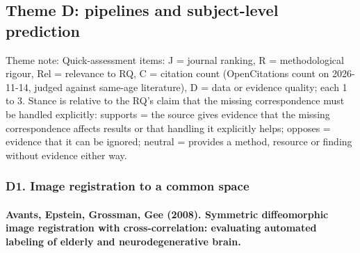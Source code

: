 \documentclass[journal,onecolumn]{IEEEtran}
\begin{document}
\subsection{Theme D: pipelines and subject-level prediction}

Theme note: Quick-assessment items: J = journal ranking, R = methodological rigour, Rel = relevance to RQ, C = citation count (OpenCitations count on 2026-11-14, judged against same-age literature), D = data or evidence quality; each 1 to 3. Stance is relative to the RQ's claim that the missing correspondence must be handled explicitly: supports = the source gives evidence that the missing correspondence affects results or that handling it explicitly helps; opposes = evidence that it can be ignored; neutral = provides a method, resource or finding without evidence either way.

\subsubsection{D1. Image registration to a common space}

\paragraph{Avants, Epstein, Grossman, Gee (2008). Symmetric diffeomorphic image registration with cross-correlation: evaluating automated labeling of elderly and neurodegenerative brain.~\cite{Avants2008Symmetric}}\mbox{}
\end{document}
